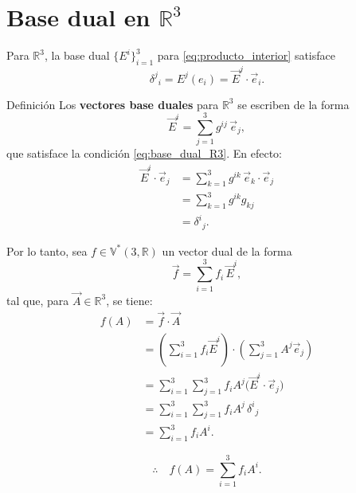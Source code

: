 \documentclass[../apunte_mecanica_clasica.tex]{subfiles}%
\begin{document}
\newpage

\section{Base dual en $\mathbb{R}^3$}

Para $\mathbb{R}^3$, la base dual $\{E^i\}_{i=1}^3$ para \eqref{eq:producto_interior} satisface
\begin{equation}\label{eq:base_dual_R3}
    \delta^j{}_i = E^j(e_i) = \vec{E}^j \cdot \vec{e}_i.
\end{equation}

\begin{apuntebloque}{Definición}
Los \textbf{vectores base duales} para $\mathbb{R}^3$ se escriben de la forma
\begin{equation}\label{eq:suma_base_dual_R3}
    \vec{E}^i = \sum_{j=1}^3 g^{ij}\, \vec{e}_j,
\end{equation}
que satisface la condición \eqref{eq:base_dual_R3}. En efecto:
\begin{align*}
    \vec{E}^i \cdot \vec{e}_j 
        &= \sum_{k=1}^3 g^{ik}\, \vec{e}_k \cdot \vec{e}_j \\[6pt]
        &= \sum_{k=1}^3 g^{ik} g_{kj} \\[6pt]
        &= \delta^i{}_j.
\end{align*}
\end{apuntebloque}

Por lo tanto, sea $f \in \mathbb{V}^*(3,\mathbb{R})$ un vector dual de la forma
\begin{equation*}
    \vec{f} = \sum_{i=1}^3 f_i \, \vec{E}^i,
\end{equation*}
tal que, para $\vec{A} \in \mathbb{R}^3$, se tiene:
\begin{align*}
    f(A) 
        &= \vec{f} \cdot \vec{A} \\[6pt]
        &= \left( \sum_{i=1}^3 f_i \vec{E}^i \right) 
           \cdot \left( \sum_{j=1}^3 A^j \vec{e}_j \right) \\[6pt]
        &= \sum_{i=1}^3 \sum_{j=1}^3 f_i A^j 
           \big( \vec{E}^i \cdot \vec{e}_j \big) \\[6pt]
        &= \sum_{i=1}^3 \sum_{j=1}^3 f_i A^j \, \delta^i{}_j \\[6pt]
        &= \sum_{i=1}^3 f_i A^i.
\end{align*}

\begin{equation*}
    \therefore \quad f(A) = \sum_{i=1}^3 f_i A^i.
\end{equation*}
\end{document}
